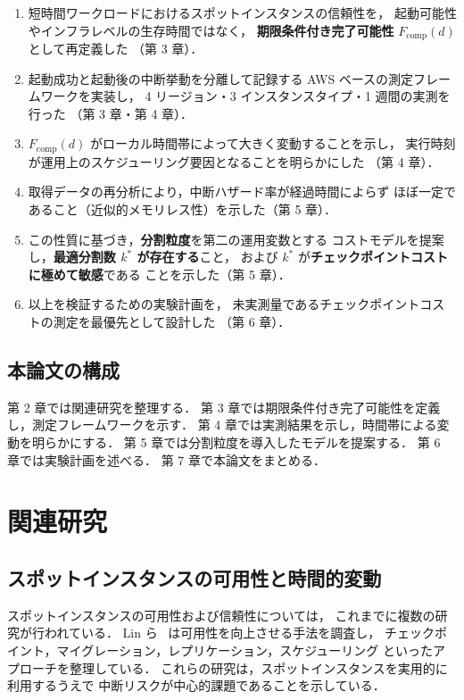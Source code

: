 \documentclass[11pt,a4paper]{ltjsreport}
\newcommand{\Fcomp}{F_{\mathrm{comp}}}
\begin{document}
\begin{enumerate}
  \item 短時間ワークロードにおけるスポットインスタンスの信頼性を，
        起動可能性やインフラレベルの生存時間ではなく，
        \textbf{期限条件付き完了可能性} $\Fcomp(d)$ として再定義した
        （第 3 章）．
  \item 起動成功と起動後の中断挙動を分離して記録する
        AWS ベースの測定フレームワークを実装し，
        4 リージョン・3 インスタンスタイプ・1 週間の実測を行った
        （第 3 章・第 4 章）．
  \item $\Fcomp(d)$ がローカル時間帯によって大きく変動することを示し，
        実行時刻が運用上のスケジューリング要因となることを明らかにした
        （第 4 章）．
  \item 取得データの再分析により，中断ハザード率が経過時間によらず
        ほぼ一定であること（近似的メモリレス性）を示した（第 5 章）．
  \item この性質に基づき，\textbf{分割粒度}を第二の運用変数とする
        コストモデルを提案し，\textbf{最適分割数 $k^{*}$ が存在する}こと，
        および $k^{*}$ が\textbf{チェックポイントコストに極めて敏感}である
        ことを示した（第 5 章）．
  \item 以上を検証するための実験計画を，
        未実測量であるチェックポイントコストの測定を最優先として設計した
        （第 6 章）．
\end{enumerate}

\section{本論文の構成}

第 2 章では関連研究を整理する．
第 3 章では期限条件付き完了可能性を定義し，測定フレームワークを示す．
第 4 章では実測結果を示し，時間帯による変動を明らかにする．
第 5 章では分割粒度を導入したモデルを提案する．
第 6 章では実験計画を述べる．
第 7 章で本論文をまとめる．

\chapter{関連研究}

\section{スポットインスタンスの可用性と時間的変動}

スポットインスタンスの可用性および信頼性については，
これまでに複数の研究が行われている．
Lin ら~\cite{Lin2022Survey} は可用性を向上させる手法を調査し，
チェックポイント，マイグレーション，レプリケーション，スケジューリング
といったアプローチを整理している．
これらの研究は，スポットインスタンスを実用的に利用するうえで
中断リスクが中心的課題であることを示している．
\end{document}
